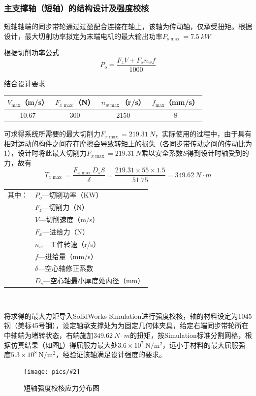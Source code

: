 \documentclass[UTF8]{article}%
\renewcommand{\arraystretch}{1.5}
\newcommand{\p}[4][0.5]{\begin{figure}[h]\centering\texttt{[image: pics/\#2]}\\\caption{#3}\label{#4}\end{figure}}%
\newcommand{\n}{\par}%
\begin{document}
\begin{spacing}{1.5}
		\subsubsection{主支撑轴（短轴）的结构设计及强度校核}
		短轴轴端的同步带轮通过过盈配合连接在轴上，该轴为传动轴，仅承受扭矩。根据设计，最大切削功率拟定为末端电机的最大输出功率$P_{o\max}=\SI{7.5}{kW}$\n
		根据切削功率公式$$P_{o}=\frac{F_zV+F_xn_wf}{1000}$$\n
		结合设计要求\n
		\begin{center}
			\renewcommand{\arraystretch}{1}
			\begin{tabular}{|c|c|c|c|}
				\hline$V_{\max}$（m/s）&$F_{x\max}$（N）&$n_{w\max}$（r/s）&$f_{\max}$（mm/s）\\
				\hline10.67&300&2150&8\\\hline
			\end{tabular}
		\end{center}\n
		可求得系统所需要的最大切削力$F_{x\max}=\SI{219.31}{N}$，实际使用的过程中，由于具有相对运动的构件之间存在摩擦会导致转矩上的损失（各同步带传动之间的传动比为1），设计时将此最大切削力$F_{x\max}=\SI{219.31}{N}$乘以安全系数$S$得到设计时轴受到的力，故有$$T_{x\max}=\frac{F_{x\max}D_sS}{\delta}=\frac{219.31\times55\times1.5}{51.75}=\SI{349.62}{N\cdot m}$$\n
		\renewcommand{\arraystretch}{1}
		\begin{tabular}{cl}
			其中：&$P_o$—切削功率（KW）\\
			&$F_z$—切削力（N）\\
			&$V$—切削速度（m/s）\\
			&$F_x$—进给力（N）\\
			&$n_w$—工件转速（r/s）\\
			&$f$—进给量（mm/s）\\
			&$\delta$—空心轴修正系数\\
			&$D_s$—空心轴最小厚度处内径（mm）\\
		\end{tabular}\\\n
		将求得的最大力矩导入SolidWorks Simulation进行强度校核，轴的材料设定为1045钢（美标45号钢），设定轴承支撑处为为固定几何体夹具，给定右端同步带轮所在中轴端为堵转状态，右端施加$\SI{349.62}{N\cdot m}$的扭矩，按Simulation标准分割网格，根据仿真结果（如图\ref{dzqdjh}）得屈服力最大处$3.6\times10^7~\mathrm{N/m^2}$，远小于材料的最大屈服强度$5.3\times10^8~\mathrm{N/m^2}$，经验证该轴满足设计强度的要求。
		\p[0.4]{短轴强度校核应力分布图.png}{短轴强度校核应力分布图}{dzqdjh}

\end{spacing}
\end{document}
